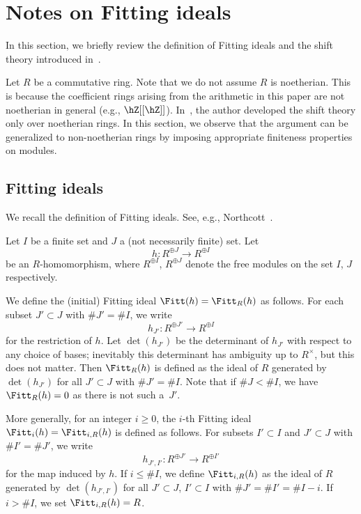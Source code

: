 \appendix

\section{Notes on Fitting ideals}\label{sec:Fitt_gen}

In this section, we briefly review the definition of Fitting ideals and the shift theory introduced in~\cite{Kata_05}.

Let $R$ be a commutative ring.
Note that we do not assume $R$ is noetherian.
This is because the coefficient rings arising from the arithmetic in this paper are not noetherian in general (e.g., $\hZ[[\hZ]]$).
In~\cite{Kata_05}, the author developed the shift theory only over noetherian rings.
In this section, we observe that the argument can be generalized to non-noetherian rings by imposing appropriate finiteness properties on modules.

\subsection{Fitting ideals}\label{ss:Fitt_defn}

We recall the definition of Fitting ideals.
See, e.g., Northcott~\cite[\S 3.1]{Nor76}.

\begin{defi}\label{defn:Fitt1}
Let $I$ be a finite set and $J$ a (not necessarily finite) set.
Let
\[
h: R^{\oplus J} \to R^{\oplus I}
\]
be an $R$-homomorphism, where $R^{\oplus I}$, $R^{\oplus J}$ denote the free modules on the set $I$, $J$ respectively.

We define the (initial) Fitting ideal $\Fitt(h) = \Fitt_R(h)$ as follows.
For each subset $J' \subset J$ with $\# J' = \# I$, we write 
\[
h_{J'}: R^{\oplus J'} \to R^{\oplus I}
\]
for the restriction of $h$.
Let $\det(h_{J'})$ be the determinant of $h_{J'}$ with respect to any choice of bases; inevitably this determinant has ambiguity up to $R^{\times}$, but this does not matter.
Then $\Fitt_R(h)$ is defined as the ideal of $R$ generated by $\det(h_{J'})$ for all $J' \subset J$ with $\# J' = \# I$.
Note that if $\# J < \# I$, we have $\Fitt_R(h) = 0$ as there is not such a~$J'$.

More generally, for an integer $i \geq 0$, the $i$-th Fitting ideal $\Fitt_i(h) = \Fitt_{i, R}(h)$ is defined as follows.
For subsets $I' \subset I$ and $J' \subset J$ with $\# I' = \# J'$, we write 
\[
h_{J', I'}: R^{\oplus J'} \to R^{\oplus I'}
\]
for the map induced by $h$.
If $i \leq \# I$, we define $\Fitt_{i, R}(h)$ as the ideal of $R$ generated by $\det(h_{J', I'})$ for all $J' \subset J$, $I' \subset I$ with $\# J' = \# I' = \# I - i$.
If $i > \# I$, we set $\Fitt_{i, R}(h) = R$.
\end{defi}

